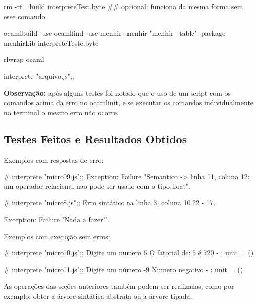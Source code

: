 \documentclass[12pt,a4paper,twoside]{article}
\begin{document}
\begin{terminal}
rm -rf  _build  interpreteTest.byte 
## opcional: funciona da mesma forma sem esse comando

ocamlbuild -use-ocamlfind -use-menhir -menhir "menhir --table" -package menhirLib interpreteTeste.byte

rlwrap ocaml

interprete "arquivo.js";;
\end{terminal}
\textbf{Observação: } após alguns testes foi notado que o uso de um script com os comandos acima da erro no ocamlinit, e se executar os comandos individualmente no terminal o mesmo erro não ocorre.

\subsection{Testes Feitos e Resultados Obtidos}
Exemplos com respostas de erro:
\begin{terminal}
# interprete "micro09.js";;
Exception:
Failure
 "Semantico -> linha 11, coluna 12: um operador relacional nao pode ser usado com o tipo float".


# interprete "micro8.js";;
Erro sintático na linha 3, coluna 10 22 - 17.

Exception: Failure "Nada a fazer!\n".

\end{terminal}
Exemplos com execução sem erros:
\begin{terminal}
# interprete "micro10.js";;
Digite um numero 
6
O fatorial de:  6  é 720 
- : unit = ()

# interprete "micro11.js";;
Digite um número 
-9
Numero negativo 
- : unit = ()
\end{terminal}
As operações das seções anteriores também podem ser realizadas, como por exemplo: obter a árvore sintática abstrata ou a árvore tipada.
\end{document}
